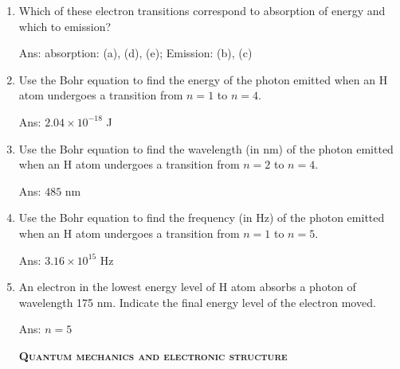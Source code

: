 \documentclass[main.tex]{subfiles}
\begin{document}
\begin{multicols*}{2}
\begin{enumerate}
\item Which of these electron transitions correspond to absorption of energy and which to emission?
\begin{enumerate}[label=(\alph*)]\end{enumerate}
  \begin{flushright}\small Ans:  absorption: (a), (d), (e); Emission: (b), (c)  \end{flushright}



\item Use the Bohr equation to  find the energy of the photon emitted when an H atom undergoes a transition from $n=1$ to $n=4$.
  \begin{flushright}\small Ans:  $2.04\times10^{-18}$ J  \end{flushright}

\item Use the Bohr equation to  find the wavelength (in nm) of the photon emitted when an H atom undergoes a transition from $n=2$ to $n=4$.
  \begin{flushright}\small Ans:  $485$ nm \end{flushright}

\item Use the Bohr equation to  find the frequency (in Hz) of the photon emitted when an H atom undergoes a transition from $n=1$ to $n=5$.
  \begin{flushright}\small Ans:  $3.16\times10^{15}$ Hz \end{flushright}


\item An electron in the lowest energy level of H atom absorbs a photon of wavelength 175 nm. Indicate the final energy level of the electron moved.
  \begin{flushright}\small Ans:  $n=5$ \end{flushright}

{\raggedright\textsc{\textbf{Quantum mechanics and electronic structure }}\par}



\end{enumerate}
\end{multicols*}
\end{document}
